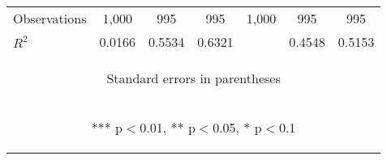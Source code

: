 \begin{center}
\begin{tabular}{lcccccc}
Observations & 1,000 & 995 & 995 & 1,000 & 995 & 995 \\
 $R^2$ & 0.0166 & 0.5534 & 0.6321 &  & 0.4548 & 0.5153 \\ \hline
\multicolumn{7}{c}{\begin{footnotesize} Standard errors in parentheses\end{footnotesize}} \\
\multicolumn{7}{c}{\begin{footnotesize} *** p$<$0.01, ** p$<$0.05, * p$<$0.1\end{footnotesize}} \\
\end{tabular}
\end{center}
